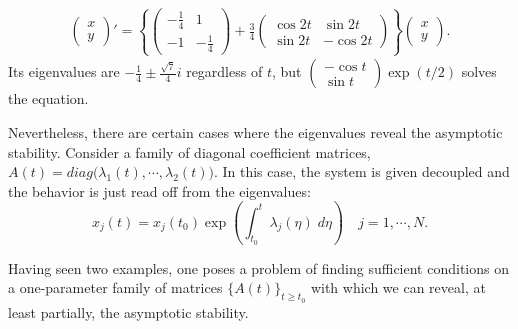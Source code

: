 \documentclass[a4paper,11pt]{article}
\theoremstyle{remark}
\begin{document}


\begin{align*}
 \begin{pmatrix}  x\\y \end{pmatrix}' = \left\{\begin{pmatrix}  -\frac{1}{4} & 1\\-1 & -\frac{1}{4} \end{pmatrix}+ \frac{3}{4}\begin{pmatrix} \cos 2t & \sin 2t\\ \sin 2t & -\cos 2t \end{pmatrix}\right\} \begin{pmatrix}  x\\y \end{pmatrix}.
\end{align*}
Its eigenvalues are $-\frac{1}{4} \pm \frac{\sqrt{7}}{4}i$ regardless of $t$, but $\begin{pmatrix}  -\cos t\\ \sin t \end{pmatrix}\exp(t/2)$ solves the equation.

Nevertheless, there are certain cases where the eigenvalues reveal the asymptotic stability. Consider a family of diagonal coefficient matrices, $A(t) = diag(\lambda_1(t), \cdots, \lambda_2(t)\big)$. In this case, the system is given decoupled  and the behavior is just read off from the eigenvalues: $$x_j(t) = x_j(t_0) \exp\left( \int_{t_0}^t \lambda_j(\eta) \;d\eta\right) \quad j=1,\cdots,N.$$

Having seen two examples, one poses a problem of finding sufficient conditions on a one-parameter family of matrices $\{A(t)\}_{t\ge t_0}$ with which we can reveal, at least partially, the asymptotic stability. 
\end{document}

